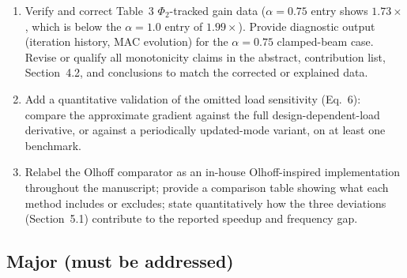 \documentclass[11pt,a4paper]{article}
\begin{document}
\begin{enumerate}[leftmargin=*, label=\textbf{CR\arabic*.}]

\item Verify and correct Table~3 $\Phi_2$-tracked gain data ($\alpha=0.75$
  entry shows $1.73\times$, which is below the $\alpha=1.0$ entry of
  $1.99\times$). Provide diagnostic output (iteration history, MAC
  evolution) for the $\alpha=0.75$ clamped-beam case. Revise or qualify
  all monotonicity claims in the abstract, contribution list,
  Section~4.2, and conclusions to match the corrected or explained data.

\item Add a quantitative validation of the omitted load sensitivity
  (Eq.~6): compare the approximate gradient against the full
  design-dependent-load derivative, or against a periodically
  updated-mode variant, on at least one benchmark.

\item Relabel the Olhoff comparator as an in-house Olhoff-inspired
  implementation throughout the manuscript; provide a comparison table
  showing what each method includes or excludes; state quantitatively
  how the three deviations (Section~5.1) contribute to the reported
  speedup and frequency gap.

\end{enumerate}

\subsection*{Major (must be addressed)}
\end{document}
